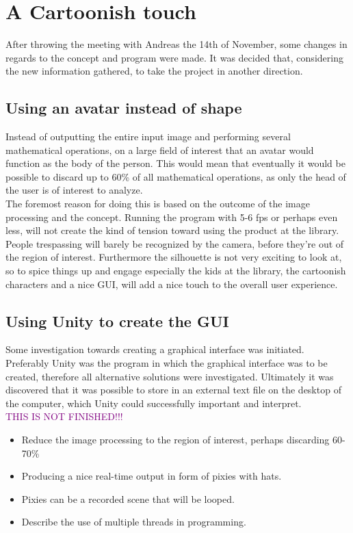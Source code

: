\section{A Cartoonish touch}
After throwing the meeting with Andreas the 14th of November, some changes in regards to the concept and program were made. It was decided that, considering the new information gathered, to take the project in another direction.

\subsection{Using an avatar instead of shape}
Instead of outputting the entire input image and performing several mathematical operations, on a large field of interest that an avatar would function as the body of the person. This would mean that eventually it would be possible to discard up to 60{\%} of all mathematical operations, as only the head of the user is of interest to analyze.\\
The foremost reason for doing this is based on the outcome of the image processing and the concept. Running the program with 5-6 fps or perhaps even less, will not create the kind of tension toward using the product at the library. People trespassing will barely be recognized by the camera, before they're out of the region of interest. Furthermore the silhouette is not very exciting to look at, so to spice things up and engage especially the kids at the library, the cartoonish characters and a nice GUI, will add a nice touch to the overall user experience. 

\subsection{Using Unity to create the GUI}
Some investigation towards creating a graphical interface was initiated. Preferably Unity was the program in which the graphical interface was to be created, therefore all alternative solutions were investigated. Ultimately it was discovered that it was possible to store in an external text file on the desktop of the computer, which Unity could successfully important and interpret.\\
  


\textcolor{purple}{THIS IS NOT FINISHED!!!}
 \begin{itemize}
\item Reduce the image processing to the region of interest, perhaps discarding 60-70{\%}
\item Producing a nice real-time output in form of pixies with hats.
\item Pixies can be a recorded scene that will be looped.
\item Describe the use of multiple threads in programming.
\end{itemize}
 
